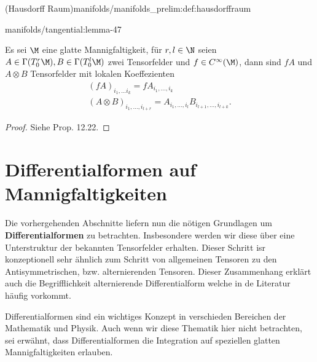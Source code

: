 \documentclass[letterpaper,10pt,english]{jupyterBook}
\begin{document}
\begin{definition}{(Hausdorff Raum)}{manifolds/manifolds_prelim:def:hausdorffraum}
\begin{lemma}{}{manifolds/tangential:lemma-47}
\par
Es sei \(\M\) eine glatte Mannigfaltigkeit, für \(r,l\in \N\) seien \(A\in \Gamma(T^r_0\M), B\in \Gamma(T^l_0\M)\) zwei Tensorfelder und \(f\in C^\infty(\M)\), dann sind \(fA\) und \(A\otimes B\) Tensorfelder mit lokalen Koeffezienten
\begin{align*}
(fA)_{i_1,\ldots i_{k}} = f A_{i_1,\ldots, i_k}\\
(A\otimes B)_{i_1,\ldots,i_{l+r}} = A_{i_1,\ldots, i_l} B_{i_{l+1},\ldots, i_{l+k}}.
\end{align*}\end{lemma}

\begin{proof}
 Siehe \cite{Lee03} Prop. 12.22.
\end{proof}


\section{Differentialformen auf Mannigfaltigkeiten}
\label{\detokenize{manifolds/diffformen:differentialformen-auf-mannigfaltigkeiten}}\label{\detokenize{manifolds/diffformen::doc}}
\par
Die vorhergehenden Abschnitte liefern nun die nötigen Grundlagen um \textbf{Differentialformen} zu betrachten. Insbesondere werden wir diese über eine Unterstruktur der bekannten Tensorfelder erhalten. Dieser Schritt isr konzeptionell sehr ähnlich zum Schritt von allgemeinen Tensoren zu den Antisymmetrischen, bzw. alternierenden Tensoren. Dieser Zusammenhang erklärt auch die Begrifflichkeit alternierende Differentialform welche in de Literatur häufig vorkommt.

\par
Differentialformen sind ein wichtiges Konzept in verschieden Bereichen der Mathematik und Physik. Auch wenn wir diese Thematik hier nicht betrachten, sei erwähnt, dass Differentialformen die Integration auf speziellen glatten Mannigfaltigkeiten erlauben.



\end{definition}
\end{document}
